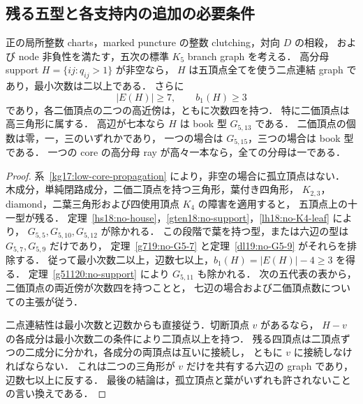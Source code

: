 \subsection{残る五型と各支持内の追加の必要条件}
\label{sf21:section}\label{sf20:section}

\begin{corollary}[非空支持の連結性と二価頂点の制約]
\label{sf21:no-leaves}\label{sf20:no-leaves}
正の局所整数 charts，marked puncture の整数 clutching，対向 $D$ の相殺，
および node 非負性を満たす，五次の標準 $K_5$ branch graph を考える．
高分母 support $H=\{ij:q_{ij}>1\}$ が非空なら，
$H$ は五頂点全てを使う二点連結 graph であり，最小次数は二以上である．
さらに
\[
 |E(H)|\ge7,\qquad b_1(H)\ge3
\]
であり，各二価頂点の二つの高近傍は，ともに次数四を持つ．
特に二価頂点は高三角形に属する．
高辺が七本なら $H$ は book 型 $G_{5,13}$ である．
二価頂点の個数は零，一，三のいずれかであり，
一つの場合は $G_{5,15}$，三つの場合は book 型である．
一つの core の高分母 ray が高々一本なら，全ての分母は一である．
\end{corollary}

\begin{proof}
系~\ref{kg17:low-core-propagation} により，非空の場合に孤立頂点はない．
木成分，単純閉路成分，二価二頂点を持つ三角形，葉付き四角形，
$K_{2,3}$，diamond，二葉三角形および四使用頂点 $K_4$ の障害を適用すると，
五頂点上の十一型が残る．
定理~\ref{hs18:no-house}，\ref{gten18:no-support}，\ref{lh18:no-K4-leaf} により，
$G_{5,5},G_{5,10},G_{5,12}$ が除かれる．
この段階で葉を持つ型，または六辺の型は $G_{5,7},G_{5,9}$ だけであり，
定理~\ref{g719:no-G5-7} と定理~\ref{dl19:no-G5-9} がそれらを排除する．
従って最小次数二以上，辺数七以上，$b_1(H)=|E(H)|-4\ge3$ を得る．
定理~\ref{g51120:no-support} により $G_{5,11}$ も除かれる．
次の五代表の表から，二価頂点の両近傍が次数四を持つことと，
七辺の場合および二価頂点数についての主張が従う．

二点連結性は最小次数と辺数からも直接従う．切断頂点 $v$ があるなら，
$H-v$ の各成分は最小次数二の条件により二頂点以上を持つ．
残る四頂点は二頂点ずつの二成分に分かれ，各成分の両頂点は互いに接続し，
ともに $v$ に接続しなければならない．
これは二つの三角形が $v$ だけを共有する六辺の graph であり，辺数七以上に反する．
最後の結論は，孤立頂点と葉がいずれも許されないことの言い換えである．
\end{proof}

